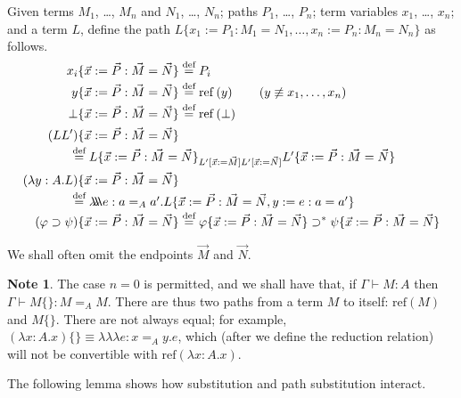 \documentclass[a4paper,UKenglish]{lipics-v2016}
\newcommand*{\eqdef}{\mathrel{\smash{\stackrel{\text{def}}{=}}}}
\newcommand*{\reff}[1]{\ensuremath{\mathrm{ref} \left( {#1} \right)}}
\newcommand*{\triplelambda}{\ensuremath{\lambda \!\! \lambda \!\! \lambda}}
\theoremstyle{plain}
\theoremstyle{definition}
\newtheorem{note}[theorem]{Note}
\begin{document}
\begin{definition}
Given terms $M_1$, \ldots, $M_n$ and $N_1$, \ldots, $N_n$; paths $P_1$, \ldots, $P_n$; term variables $x_1$, \ldots, $x_n$; and a term $L$, define the path $L \{ x_1 := P_1 : M_1 = N_1 , \ldots, x_n := P_n : M_n = N_n \}$ as follows.
\begin{align*}
x_i \{ \vec{x} := \vec{P} : \vec{M} = \vec{N} \} & \eqdef P_i \\
y \{ \vec{x} := \vec{P} : \vec{M} = \vec{N} \} & \eqdef \reff{y} \qquad (y \not\equiv x_1, \ldots, x_n) \\
\bot \{ \vec{x} := \vec{P} : \vec{M} = \vec{N} \} & \eqdef \reff{\bot} \\
(LL') \{ \vec{x} := \vec{P} : \vec{M} = \vec{N} \} \\
\omit\rlap{\qquad \qquad $\eqdef L \{ \vec{x} := \vec{P} : \vec{M} = \vec{N} \}_{L' [\vec{x} := \vec{M}] L' [\vec{x} := \vec{N}]} L' \{ \vec{x} := \vec{P} : \vec{M} = \vec{N} \}$} \\
(\lambda y:A.L) \{ \vec{x} := \vec{P} : \vec{M} = \vec{N} \} & \\
\omit\rlap{\qquad\qquad $\eqdef \triplelambda e : a =_A a' . L \{ \vec{x} := \vec{P} : \vec{M} = \vec{N} , y := e : a = a' \}$} \\
(\varphi \supset \psi) \{ \vec{x} := \vec{P} : \vec{M} = \vec{N} \} & \eqdef \varphi \{ \vec{x} := \vec{P} : \vec{M} = \vec{N} \} \supset^* \psi \{ \vec{x} := \vec{P} : \vec{M} = \vec{N} \}
\end{align*}
\end{definition}

We shall often omit the endpoints $\vec{M}$ and $\vec{N}$.

\begin{note}
The case $n = 0$ is permitted, and we shall have that, if $\Gamma \vdash M : A$ then $\Gamma \vdash M \{\} : M =_A M$.  There are thus two paths from a term $M$ to itself: $\reff{M}$ and $M \{\}$.  There are not always equal; for example, $(\lambda x:A.x) \{\} \equiv \triplelambda e : x =_A y. e$, which (after we define the reduction relation) will not be convertible with $\reff{\lambda x:A.x}$.
\end{note}

The following lemma shows how substitution and path substitution interact.
\end{document}
